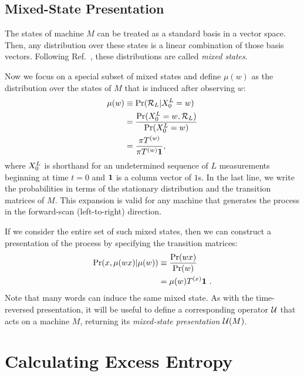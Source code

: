 \subsection{Mixed-State Presentation}
\label{MSP}

The states of machine $M$ can be treated as a standard basis in a vector space.
Then, any distribution over these states is a linear combination of those
basis vectors. Following Ref.~\cite{Uppe97a}, these distributions are 
called \emph{mixed states}. 

Now we focus on a special subset of mixed states and define $\mu(w)$ as 
the distribution over the states of $M$ that is induced after observing $w$:
\begin{align}
\label{mixedstates}
\mu(w) 
  &\equiv \Pr(\mathcal{R}_L | {X}_0^L=w)  \\
  & = \frac{\Pr({X}_0^L=w, \mathcal{R}_L)}{\Pr({X}_0^L=w)} 
\\
  &= \frac{\pi T^{(w)}}{\pi T^{(w)} \mathbf{1}},
\end{align}
where ${X}_0^L$ is shorthand for an undetermined sequence of $L$ 
measurements beginning at time $t=0$ and $\mathbf{1}$ is a column vector of $1$s.
In the last line, we write the
probabilities in terms of the stationary distribution and the transition
matrices of $M$.  This expansion is valid for any machine that generates
the process in the forward-scan (left-to-right) direction.

If we consider the entire set of such mixed states, then we can construct a 
presentation of the process by specifying the transition matrices:
\begin{align}
\Pr({x}, \mu(w{x}) | \mu(w))
  & \equiv \frac{\Pr(wx)}{\Pr(w)} \\
  & = \mu(w) T^{(x)} \mathbf{1} ~.
\end{align}
Note that many words can induce the same mixed state. As with the time-reversed 
presentation, it will be useful to define a
corresponding operator $\mathcal{U}$ that acts on a machine $M$, returning its
\emph{mixed-state presentation} $\mathcal{U}(M)$.

\section{Calculating Excess Entropy}

